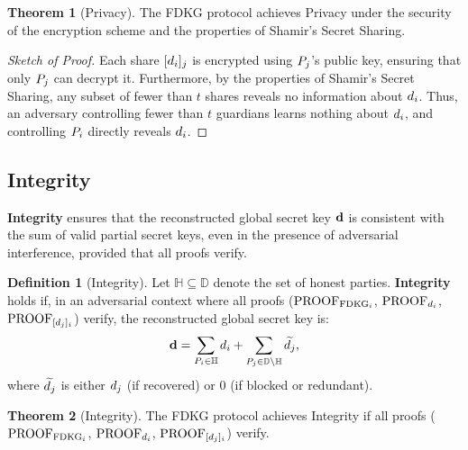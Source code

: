 \documentclass[lettersize,journal]{IEEEtran}
\theoremstyle{definition}
\newtheorem{definition}{Definition}
\newtheorem{theorem}{Theorem}
\begin{document}
\begin{theorem}[Privacy]
\label{thm:privacy}
The FDKG protocol achieves Privacy under the security of the encryption scheme and the properties of Shamir's Secret Sharing.
\end{theorem}

\begin{proof}[Sketch of Proof]
Each share \([d_{i}]_{j}\) is encrypted using \(P_{j}\)'s public key, ensuring that only \(P_{j}\) can decrypt it. Furthermore, by the properties of Shamir's Secret Sharing, any subset of fewer than \(t\) shares reveals no information about \(d_{i}\). Thus, an adversary controlling fewer than \(t\) guardians learns nothing about \(d_{i}\), and controlling \(P_{i}\) directly reveals \(d_{i}\).
\end{proof}

\subsection{Integrity}
\label{subsec:integrity}

\textbf{Integrity} ensures that the reconstructed global secret key \(\textbf{d}\) is consistent with the sum of valid partial secret keys, even in the presence of adversarial interference, provided that all proofs verify.

\begin{definition}[Integrity]
\label{def:integrity}
Let \(\mathbb{H} \subseteq \mathbb{D}\) denote the set of honest parties. \textbf{Integrity} holds if, in an adversarial context where all proofs (\(\textrm{PROOF}_{\textrm{FDKG}_{i}}\), \(\textrm{PROOF}_{d_{i}}\), \(\textrm{PROOF}_{[d_{j}]_{i}}\)) verify, the reconstructed global secret key is:
\[
\textbf{d}{} = \sum_{P_{i} \in \mathbb{H}} d_{i} + \sum_{P_{j} \in \mathbb{D} \setminus \mathbb{H}} \widetilde{d_{j}},
\]
where \(\widetilde{d_{j}}\) is either \(d_{j}\) (if recovered) or \(0\) (if blocked or redundant).
\end{definition}

\begin{theorem}[Integrity]
\label{thm:integrity}
The FDKG protocol achieves Integrity if all proofs (\(\textrm{PROOF}_{\textrm{FDKG}_{i}}\), \(\textrm{PROOF}_{d_{i}}\), \(\textrm{PROOF}_{[d_{j}]_{i}}\)) verify.
\end{theorem}
\end{document}
